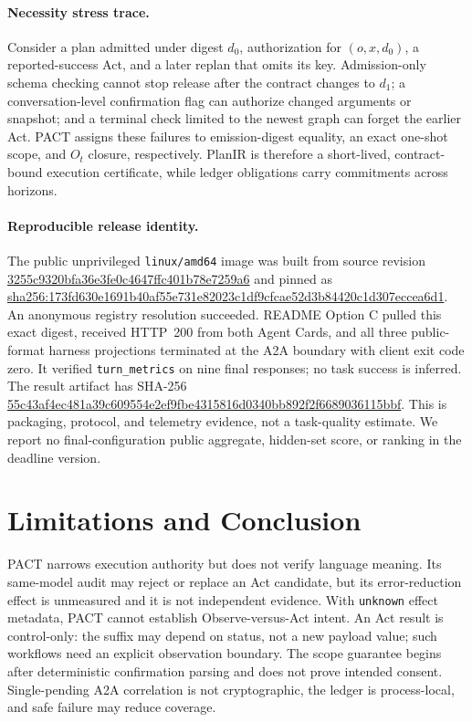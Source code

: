 \documentclass{article}
\begin{document}
\paragraph{Necessity stress trace.}
Consider a plan admitted under digest $d_0$, authorization for
$(o,x,d_0)$, a reported-success Act, and a later replan that omits its key.
Admission-only schema checking cannot stop release after the contract changes
to $d_1$; a conversation-level confirmation flag can authorize changed
arguments or snapshot; and a terminal check limited to the newest graph can
forget the earlier Act.  PACT assigns these failures to emission-digest
equality, an exact one-shot scope, and $O_t$ closure, respectively.  PlanIR is
therefore a short-lived, contract-bound execution certificate, while ledger
obligations carry commitments across horizons.

\paragraph{Reproducible release identity.}
The public unprivileged \texttt{linux/amd64} image was built from source
revision \url{3255c9320bfa36e3fe0c4647ffc401b78e7259a6} and pinned as
\url{sha256:173fd630e1691b40af55e731e82023c1df9cfcae52d3b84420c1d307eccea6d1}.
An anonymous registry resolution succeeded.  README Option C pulled this exact
digest, received HTTP~200 from both Agent Cards, and all three public-format
harness projections terminated at the A2A boundary with client exit code zero.
It verified \texttt{turn\_metrics} on nine final responses; no task success is
inferred.  The result artifact has
SHA-256
\url{55c43af4ec481a39c609554e2ef9fbe4315816d0340bb892f2f6689036115bbf}.
This is packaging, protocol, and telemetry evidence, not a task-quality
estimate.  We report no final-configuration public aggregate, hidden-set score,
or ranking in the deadline version.

\section{Limitations and Conclusion}

PACT narrows execution authority but does not verify language meaning.  Its
same-model audit may reject or replace an Act candidate, but its error-reduction
effect is unmeasured and it is not independent evidence.  With
\texttt{unknown} effect metadata, PACT cannot establish Observe-versus-Act
intent.  An Act result is control-only: the suffix may depend on status, not a
new payload value; such workflows need an explicit observation boundary.  The
scope guarantee begins after deterministic confirmation parsing and does not
prove intended consent.  Single-pending A2A correlation is not cryptographic,
the ledger is process-local, and safe failure may reduce coverage.
\end{document}

